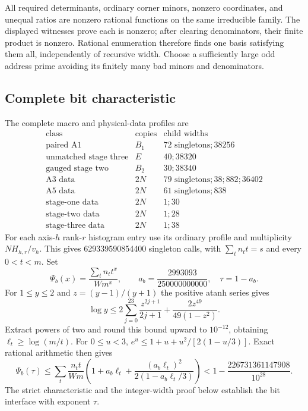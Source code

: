 All required determinants, ordinary corner minors, nonzero coordinates,
and unequal ratios are nonzero rational functions on the same
irreducible family. The displayed witnesses prove each is nonzero;
after clearing denominators, their finite product is nonzero.
Rational enumeration therefore finds one basis satisfying them all,
independently of recursive width. Choose a sufficiently large odd
address prime avoiding its finitely many bad minors and denominators.

\subsection{Complete bit characteristic}
The complete macro and physical-data profiles are
\[
\begin{array}{c|r|l}
\text{class}&\text{copies}&\text{child widths}\\\hline
\text{paired A1}&B_1&72\text{ singletons};38256\\
\text{unmatched stage three}&E&40;38320\\
\text{gauged stage two}&B_2&30;38340\\
\text{A3 data}&2N&79\text{ singletons};38;882;36402\\
\text{A5 data}&2N&61\text{ singletons};838\\
\text{stage-one data}&2N&1;30\\
\text{stage-two data}&2N&1;28\\
\text{stage-three data}&2N&1;38
\end{array}
\]
For each axis-$h$ rank-$r$ histogram entry use its ordinary profile
and multiplicity $NH_{h,r}/v_h$. This gives 629339590854400 singleton
calls, with $\sum_tn_tt=s$ and every $0<t<m$. Set
\[
 \Psi_b(x)=\frac{\sum_tn_tt^x}{Wm^x},\qquad
 a_b=\frac{2993093}{250000000000},\quad \tau=1-a_b.
\]
For $1\le y\le2$ and $z=(y-1)/(y+1)$ the positive atanh series gives
\[
 \log y\le 2\sum_{j=0}^{23}\frac{z^{2j+1}}{2j+1}
                  +\frac{2z^{49}}{49(1-z^2)}.
\]
Extract powers of two and round this bound upward to $10^{-12}$,
obtaining $\ell_t\ge\log(m/t)$. For $0\le u<3$,
$e^u\le1+u+u^2/[2(1-u/3)]$. Exact rational arithmetic then gives
\[
 \Psi_b(\tau)\le\sum_t\frac{n_tt}{Wm}
 \left(1+a_b\ell_t+\frac{(a_b\ell_t)^2}{2(1-a_b\ell_t/3)}\right)
 <1-\frac{226731361147908}{10^{28}}.
\]
The strict characteristic and the integer-width proof below establish
the bit interface with exponent $\tau$.

